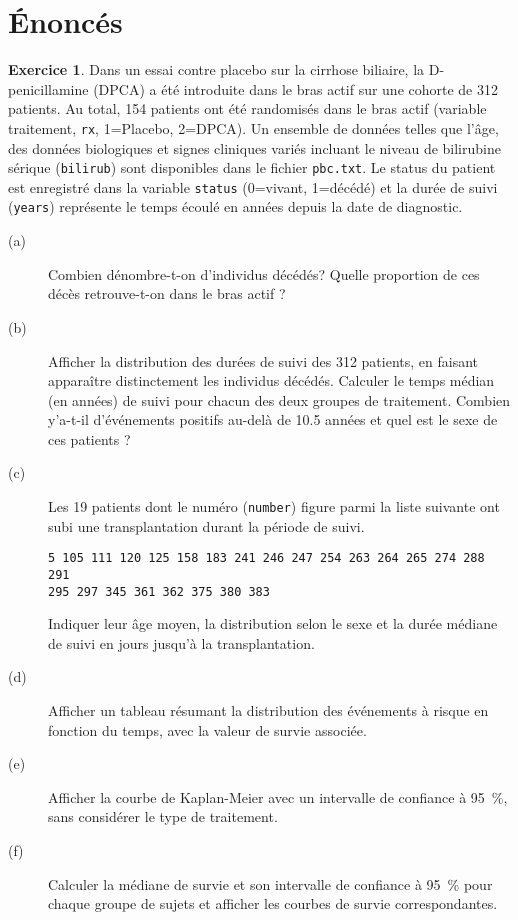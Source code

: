 \documentclass[11pt]{report}
\theoremstyle{definition}
\newtheorem{exo}{Exercice}[chapter]
\begin{document}
\section*{Énoncés}
%
% 
%
\begin{exo}\label{exo:7.1}
Dans un essai contre placebo sur la cirrhose biliaire, la D-penicillamine
(DPCA) a été introduite dans le bras actif sur une cohorte de 312
patients. Au total, 154 patients ont été randomisés dans le bras actif
(variable traitement, \texttt{rx}, 1=Placebo, 2=DPCA). Un ensemble de
données telles que l'âge, des données biologiques et signes cliniques variés
incluant le niveau de bilirubine sérique (\texttt{bilirub}) sont disponibles
dans le fichier \texttt{pbc.txt}.\autocite{vittinghoff05} Le status du
patient est enregistré dans la variable \texttt{status} (0=vivant, 1=décédé)
et la durée de suivi (\texttt{years}) représente le temps écoulé en années
depuis la date de diagnostic.
\begin{description}
\item[(a)] Combien dénombre-t-on d'individus décédés? Quelle proportion de
  ces décès retrouve-t-on dans le bras actif ?  
\item[(b)] Afficher la distribution des durées de suivi des 312 patients, en
  faisant apparaître distinctement les individus décédés. Calculer le temps
  médian (en années) de suivi pour chacun des deux groupes de
  traitement. Combien y'a-t-il d'événements positifs au-delà de 10.5 années
  et quel est le sexe de ces patients ?
\item[(c)] Les 19 patients dont le numéro (\texttt{number}) figure parmi la
  liste suivante ont subi une transplantation durant la période de suivi.
\begin{verbatim}  
5 105 111 120 125 158 183 241 246 247 254 263 264 265 274 288 291
295 297 345 361 362 375 380 383
\end{verbatim}   
  Indiquer leur âge moyen, la distribution selon le sexe et la durée médiane
  de suivi en jours jusqu'à la transplantation.
\item[(d)] Afficher un tableau résumant la distribution des événements à
  risque en fonction du temps, avec la valeur de survie associée.
\item[(e)] Afficher la courbe de Kaplan-Meier avec un intervalle de
  confiance à 95~\%, sans considérer le type de traitement.
\item[(f)] Calculer la médiane de survie et son intervalle de confiance à
  95~\% pour chaque groupe de sujets et afficher les courbes de survie
  correspondantes.

\end{description}
\end{exo}
\end{document}
